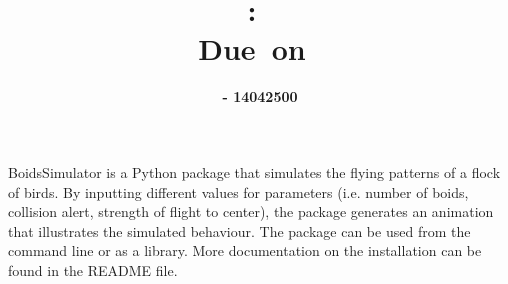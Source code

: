 \documentclass{article}
\title{
\vspace{2in}
\textmd{\textbf{\hmwkClass:\ \hmwkTitle}}\\
\normalsize\vspace{0.1in}\small{Due\ on\ \hmwkDueDate}\\
\vspace{3in}
}
\author{\textbf{\hmwkAuthorName  - 14042500}}
\date{} %
\begin{document}
\maketitle



\newpage

BoidsSimulator is a Python package that simulates the flying patterns of a flock of birds. By inputting different values for parameters (i.e. number of boids, collision alert, strength of flight to center), the package generates an animation that illustrates the simulated behaviour. The package can be used from the command line or as a library. More documentation on the installation can be found in the README file.  \\


\end{document}
